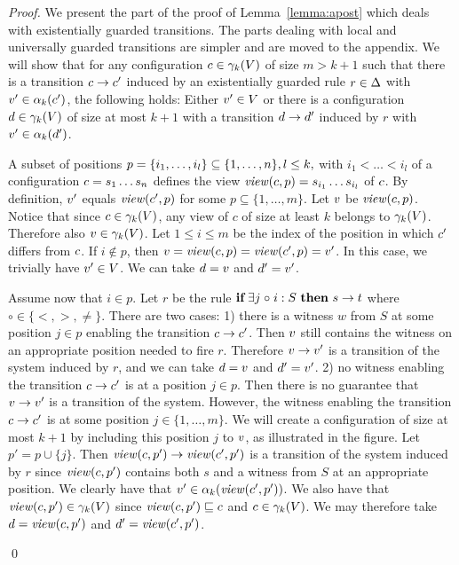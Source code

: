 \begin{proof}
  We present the part of the proof of Lemma~\ref{lemma:apost} which
  deals with existentially guarded transitions. The parts dealing with
  local and universally guarded transitions are simpler and are moved
  to the appendix.
We will show that for any configuration $\conf\in\gammaof k (V)$ of size $m > k+1$
%
such that there is a transition $\conf\trans\conf'$ 
%
induced by an existentially guarded rule $r\in\rules$
%
with $\view'\in \projof {\conf'} k$,
%
the following holds:
%
Either $\view'\in V$
%
or there is a configuration $\confd\in\gammaof k(V)$ of size at most $k+1$
%
with a transition $\confd\trans\confd'$ induced by $r$ with $\view'\in \projof {\confd'} k$. 


A subset of positions $\pos = \{i_1,\ldots, i_l\}\subseteq \{1,\ldots, n\},l\leq k,$ with $i_1<\ldots < i_l$ of a  configuration $\conf = \loc_1\ldots\loc_n$ 
%
defines the view 
%
$\viewof \conf \pos = \loc_{i_1}\ldots \loc_{i_l}$ of $\conf$.
%
By definition, 
%
$\view'$ equals $\viewof {\conf'} p$ for some $p\subseteq\{1,\ldots,m\}$.
%
Let $\view$ be $\viewof {\conf} p$.
%
Notice that since $c\in\gammaof k(V)$, 
any view of $c$ of size at least $k$ belongs to $\gammaof k(V)$.
%
Therefore also $\view\in\gammaof k(V)$.
%
%
Let $1\leq i\leq m$ be the index of the position in which $\conf'$ differs from $\conf$.
%
If $i\not\in p$, then $\view = \viewof {\conf} p = \viewof {\conf'} p = \view'$. 
%
In this case, we trivially have $\view'\in V$. 
%
We can take $\confd = \view$ and $\confd'=\view'$.
%

Assume now that $i\in p$.
%
Let $r$ be the rule $\quantrule{s}{t}{\exists}{\circ}{S}$ where $\circ\in\{<,>,\neq\}$.
%
There are two cases:
%
1) there is a witness $w$ from $S$ at some position $j\in p$ enabling the transition $\conf\trans\conf'$. 
%
Then $\view$ still contains the witness on an appropriate position needed to fire $r$. 
%
Therefore $\view\trans\view'$ is a transition of the system induced by $r$,
%
and we can take $\confd = \view$ and $\confd'=\view'$.
%
2) no witness enabling the transition $\conf\trans\conf'$ is at a position $j\in p$. 
%
Then there is no guarantee that $\view\trans\view'$ is a transition of the system. 
%
However, the witness enabling the transition $\conf\trans\conf'$ 
%
is at some position $j\in\{1,\ldots,m\}$. 
%
We will create a configuration of size at most $k+1$ by including this position $j$ to $\view$, as illustrated in the figure.
%
Let $p'= p\cup\{j\}$. 
%
Then $\viewof {\conf} {p'} \trans \viewof {\conf'} {p'}$ is a transition of the system induced by $r$ 
%
since
%
$\viewof {\conf} {p'}$ contains both $s$ and a witness from $S$ at an appropriate position. 
%
We clearly have that $\view'\in\projof {\viewof {\conf'} {p'} } k$.
%
We also have that $\viewof {\conf} {p'} \in \gammaof k(V)$  
%
since $\viewof {\conf} {p'}\subword \conf$ and $\conf\in\gammaof k (V)$.
%
We may therefore take $\confd = \viewof {\conf} {p'}$ and $\confd' = \viewof {\conf'} {p'}$.
%
%

%
\qed
\end{proof}

